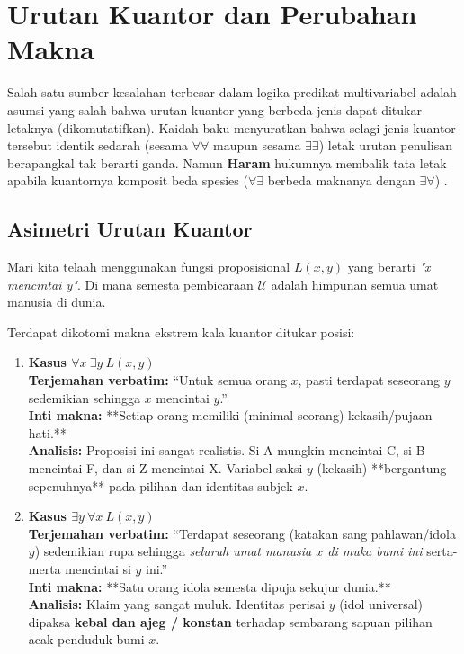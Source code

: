 \section{Urutan Kuantor dan Perubahan Makna}

Salah satu sumber kesalahan terbesar dalam logika predikat multivariabel adalah asumsi yang salah bahwa urutan kuantor yang berbeda jenis dapat ditukar letaknya (dikomutatifkan). Kaidah baku menyuratkan bahwa selagi jenis kuantor tersebut identik sedarah (sesama $\forall \forall$ maupun sesama $\exists \exists$) letak urutan penulisan berapangkal tak berarti ganda. Namun \textbf{Haram} hukumnya membalik tata letak apabila kuantornya komposit beda spesies ($\forall \exists$ berbeda maknanya dengan $\exists \forall$) \cite{rosen2019}.

\subsection{Asimetri Urutan Kuantor}

Mari kita telaah menggunakan fungsi proposisional $L(x,y)$ yang berarti \textit{"x mencintai y"}. Di mana semesta pembicaraan $\mathcal{U}$ adalah himpunan semua umat manusia di dunia.

Terdapat dikotomi makna ekstrem kala kuantor ditukar posisi:

\begin{enumerate}
    \item \textbf{Kasus $\forall x \ \exists y \ L(x, y)$} \\
    \textbf{Terjemahan verbatim:} ``Untuk semua orang $x$, pasti terdapat seseorang $y$ sedemikian sehingga $x$ mencintai $y$.'' \\
    \textbf{Inti makna:} **Setiap orang memiliki (minimal seorang) kekasih/pujaan hati.** \\
    \textbf{Analisis:} Proposisi ini sangat realistis. Si A mungkin mencintai C, si B mencintai F, dan si Z mencintai X. Variabel saksi $y$ (kekasih) **bergantung sepenuhnya** pada pilihan dan identitas subjek $x$.
    
    \item \textbf{Kasus $\exists y \ \forall x \ L(x, y)$} \\
    \textbf{Terjemahan verbatim:} ``Terdapat seseorang (katakan sang pahlawan/idola $y$) sedemikian rupa sehingga \textit{seluruh umat manusia $x$ di muka bumi ini} serta-merta mencintai si $y$ ini.'' \\
    \textbf{Inti makna:} **Satu orang idola semesta dipuja sekujur dunia.** \\
    \textbf{Analisis:} Klaim yang sangat muluk. Identitas perisai $y$ (idol universal) dipaksa \textbf{kebal dan ajeg / konstan} terhadap sembarang sapuan pilihan acak penduduk bumi $x$. 
\end{enumerate}

